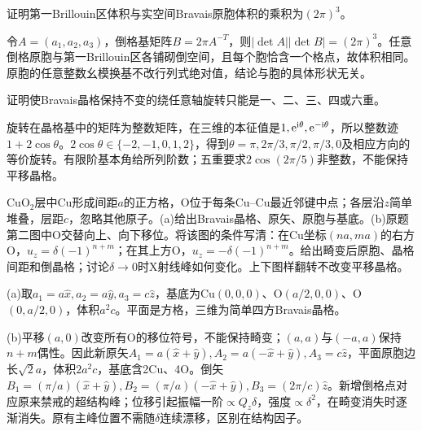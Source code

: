 \begin{exercise}[原题1]\label{p:511-1-1}
证明第一Brillouin区体积与实空间Bravais原胞体积的乘积为$(2\pi)^3$。
\end{exercise}
\begin{solution}
令$A=(a_1,a_2,a_3)$，倒格基矩阵$B=2\pi A^{-T}$，则$|\det A||\det B|=(2\pi)^3$。任意倒格原胞与第一Brillouin区各铺砌倒空间，且每个胞恰含一个格点，故体积相同。原胞的任意整数幺模换基不改行列式绝对值，结论与胞的具体形状无关。
\end{solution}
\begin{exercise}[原题2]
证明使Bravais晶格保持不变的绕任意轴旋转只能是一、二、三、四或六重。
\end{exercise}
\begin{solution}
旋转在晶格基中的矩阵为整数矩阵，在三维的本征值是$1,\mathrm e^{\mathrm i\theta},\mathrm e^{-\mathrm i\theta}$，所以整数迹$1+2\cos\theta$。$2\cos\theta\in\{-2,-1,0,1,2\}$，得到$\theta=\pi,2\pi/3,\pi/2,\pi/3,0$及相应方向的等价旋转。有限阶基本角给所列阶数；五重要求$2\cos(2\pi/5)$非整数，不能保持平移晶格。
\end{solution}
\begin{exercise}[原题3]
CuO$_2$层中Cu形成间距$a$的正方格，O位于每条Cu--Cu最近邻键中点；各层沿$z$简单堆叠，层距$c$，忽略其他原子。(a)给出Bravais晶格、原矢、原胞与基底。(b)原题第二图中O交替向上、向下移位。将该图的条件写清：在Cu坐标$(na,ma)$的右方O，$u_z=\delta(-1)^{n+m}$；在其上方O，$u_z=-\delta(-1)^{n+m}$。给出畸变后原胞、晶格间距和倒晶格；讨论$\delta\to0$时X射线峰如何变化。上下图样翻转不改变平移晶格。
\end{exercise}
\begin{solution}
(a)取$a_1=a\hat x,a_2=a\hat y,a_3=c\hat z$，基底为Cu$(0,0,0)$、O$(a/2,0,0)$、O$(0,a/2,0)$，体积$a^2c$。平面是方格，三维为简单四方Bravais晶格。

(b)平移$(a,0)$改变所有O的移位符号，不能保持畸变；$(a,a)$与$(-a,a)$保持$n+m$偶性。因此新原矢$A_1=a(\hat x+\hat y),A_2=a(-\hat x+\hat y),A_3=c\hat z$，平面原胞边长$\sqrt2a$，体积$2a^2c$，基底含2Cu、4O。倒矢$B_1=(\pi/a)(\hat x+\hat y),B_2=(\pi/a)(-\hat x+\hat y),B_3=(2\pi/c)\hat z$。新增倒格点对应原来禁戒的超结构峰；位移引起振幅一阶$\propto Q_z\delta$，强度$\propto\delta^2$，在畸变消失时逐渐消失。原有主峰位置不需随$\delta$连续漂移，区别在结构因子。
\end{solution}
